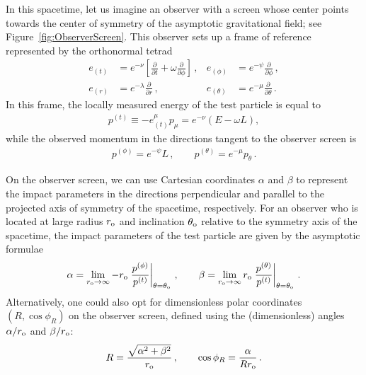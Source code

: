 \documentclass[graybox,envcountchap]{svmult}
\newcommand{\br}[1]{\left[#1\right]}
\newcommand{\pa}[1]{\left(#1\right)}
\begin{document}
In this spacetime, let us imagine an observer with a screen whose center points towards the center of symmetry of the asymptotic gravitational field; see Figure~\ref{fig:ObserverScreen}.
This observer sets up a frame of reference represented by the orthonormal tetrad
\begin{align*}
    e_{(t)}&=e^{-\nu}\br{\frac{\partial}{\partial t}+\omega\frac{\partial}{\partial\phi}}\,,&
    e_{(\phi)}&=e^{-\psi}\frac{\partial}{\partial\phi}\,,\\
    e_{(r)}&=e^{-\lambda}\frac{\partial}{\partial r}\,,&
    e_{(\theta)}&=e^{-\mu}\frac{\partial}{\partial\theta}\,.
\end{align*}
In this frame, the locally measured energy of the test particle is equal to
\begin{align}
    p^{(t)}\equiv-e_{(t)}^\mu p_\mu
    =e^{-\nu}\pa{E-\omega L},
\end{align}
while the observed momentum in the directions tangent to the observer screen is
\begin{align}
    p^{(\phi)}=e^{-\psi}L\,,\qquad
    p^{(\theta)}= e^{-\mu}p_\theta\,.
\end{align}

On the observer screen, we can use Cartesian coordinates $\alpha$ and $\beta$ to represent the impact parameters in the directions perpendicular and parallel to the projected axis of symmetry of the spacetime, respectively.
For an observer who is located at large radius $r_{\rm o}$ and inclination $\theta_{\rm o}$ relative to the symmetry axis of the spacetime, the impact parameters of the test particle are given by the asymptotic formulae \cite{Bardeen1973,Gralla2018}
\begin{align}
    \label{eq:GeneralCoordinates}
    \alpha=\lim_{r_{\rm o}\to\infty}-r_{\rm o}\left.\frac{p^{(\phi)}}{p^{(t)}}\right|_{\theta=\theta_{\rm o}}\,,\qquad
    \beta=\lim_{r_{\rm o}\to\infty}r_{\rm o}\left.\frac{p^{(\theta)}}{p^{(t)}}\right|_{\theta=\theta_{\rm o}}\,.
\end{align}
Alternatively, one could also opt for dimensionless polar coordinates $(R,\cos{\phi_R})$ on the observer screen, defined using the (dimensionless) angles $\alpha/r_{\rm o}$ and $\beta/r_{\rm o}$:
\begin{align}
    R=\frac{\sqrt{\alpha^2+\beta^2}}{r_{\rm o}}\,,\qquad
    \cos{\phi_R}=\frac{\alpha}{Rr_{\rm o}}\,.
\end{align}
\end{document}
